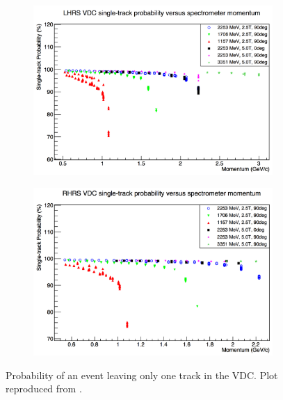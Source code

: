 \begin{figure}[b!]
  \centering
  \begin{subfigure}[t]{0.49\textwidth}
    \includegraphics[width=\textwidth]{figs/single-track-left.png}
  \end{subfigure}
  \begin{subfigure}[t]{0.49\textwidth}
    \includegraphics[width=\textwidth]{figs/single-track-right.png}
  \end{subfigure}
  \caption[Probability of an event leaving only one track in the VDC.]{Probability of an event leaving only one track in the VDC. Plot reproduced from \cite{Liu2013}. \label{C7S2SS1F1}}
\end{figure}

